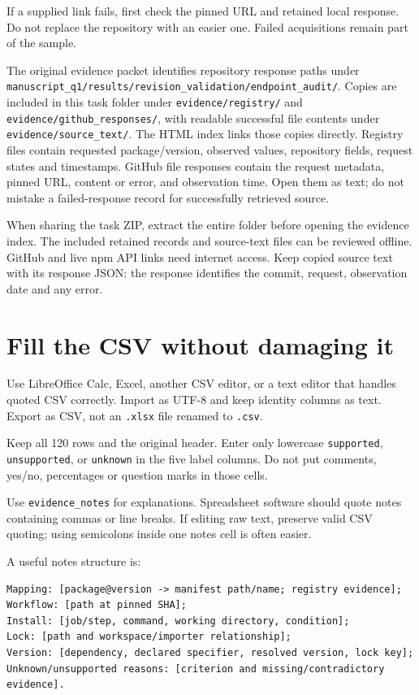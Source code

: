 \documentclass[11pt,a4paper]{article}
\begin{document}
If a supplied link fails, first check the pinned URL and retained local response. Do not replace the repository with an easier one. Failed acquisitions remain part of the sample.


The original evidence packet identifies repository response paths under \nolinkurl{manuscript_q1/results/revision_validation/endpoint_audit/}. Copies are included in this task folder under \nolinkurl{evidence/registry/} and \nolinkurl{evidence/github_responses/}, with readable successful file contents under \nolinkurl{evidence/source_text/}. The HTML index links those copies directly. Registry files contain requested package/version, observed values, repository fields, request states and timestamps. GitHub file responses contain the request metadata, pinned URL, content or error, and observation time. Open them as text; do not mistake a failed-response record for successfully retrieved source.


When sharing the task ZIP, extract the entire folder before opening the evidence index. The included retained records and source-text files can be reviewed offline. GitHub and live npm API links need internet access. Keep copied source text with its response JSON: the response identifies the commit, request, observation date and any error.


\section{Fill the CSV without damaging it}


Use LibreOffice Calc, Excel, another CSV editor, or a text editor that handles quoted CSV correctly. Import as UTF-8 and keep identity columns as text. Export as CSV, not an \nolinkurl{.xlsx} file renamed to \nolinkurl{.csv}.


Keep all 120 rows and the original header. Enter only lowercase \nolinkurl{supported}, \nolinkurl{unsupported}, or \nolinkurl{unknown} in the five label columns. Do not put comments, yes/no, percentages or question marks in those cells.


Use \nolinkurl{evidence_notes} for explanations. Spreadsheet software should quote notes containing commas or line breaks. If editing raw text, preserve valid CSV quoting; using semicolons inside one notes cell is often easier.


A useful notes structure is:


\begin{lstlisting}
Mapping: [package@version -> manifest path/name; registry evidence];
Workflow: [path at pinned SHA];
Install: [job/step, command, working directory, condition];
Lock: [path and workspace/importer relationship];
Version: [dependency, declared specifier, resolved version, lock key];
Unknown/unsupported reasons: [criterion and missing/contradictory evidence].
\end{lstlisting}
\end{document}
